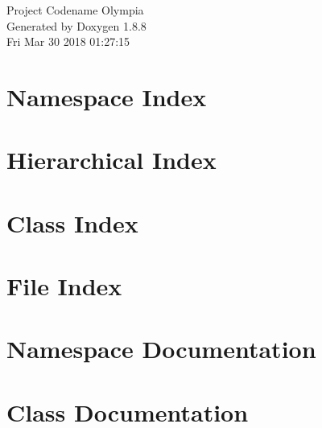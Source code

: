 \documentclass[twoside]{book}
\newcommand{\+}{\discretionary{\mbox{\scriptsize$\hookleftarrow$}}{}{}}
\newcommand{\clearemptydoublepage}{%
  \newpage{\pagestyle{empty}\cleardoublepage}%
}
\begin{document}
\hypersetup{pageanchor=false,
             bookmarks=true,
             bookmarksnumbered=true,
             pdfencoding=unicode
            }
\begin{titlepage}
\vspace*{7cm}
\begin{center}%
{\Large Project Codename Olympia }\\
\vspace*{1cm}
{\large Generated by Doxygen 1.8.8}\\
\vspace*{0.5cm}
{\small Fri Mar 30 2018 01:27:15}\\
\end{center}
\end{titlepage}
\clearemptydoublepage
\tableofcontents
\clearemptydoublepage
{}
\hypersetup{pageanchor=true}

\chapter{Namespace Index}

\chapter{Hierarchical Index}

\chapter{Class Index}

\chapter{File Index}

\chapter{Namespace Documentation}

\chapter{Class Documentation}





















\end{document}
